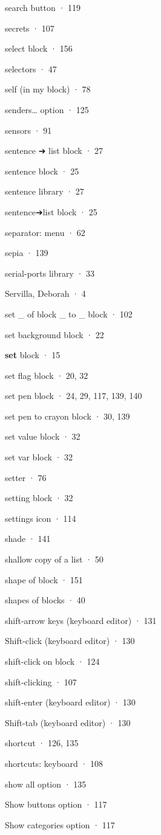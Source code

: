\documentclass[
  letterpaper,
]{book}
\begin{document}
search button · 119

secrets · 107

select block · 156

selectors · 47

self (in my block) · 78

senders\ldots{} option · 125

sensors · 91

sentence ➔ list block · 27

sentence block · 25

sentence library · 27

sentence➔list block · 25

separator: menu · 62

sepia · 139

serial-ports library · 33

Servilla, Deborah · 4

set \_ of block \_ to \_ block · 102

set background block · 22

\textbf{set} block · 15

set flag block · 20, 32

set pen block · 24, 29, 117, 139, 140

set pen to crayon block · 30, 139

set value block · 32

set var block · 32

setter · 76

setting block · 32

settings icon · 114

shade · 141

shallow copy of a list · 50

shape of block · 151

shapes of blocks · 40

shift-arrow keys (keyboard editor) · 131

Shift-click (keyboard editor) · 130

shift-click on block · 124

shift-clicking · 107

shift-enter (keyboard editor) · 130

Shift-tab (keyboard editor) · 130

shortcut · 126, 135

shortcuts: keyboard · 108

show all option · 135

Show buttons option · 117

Show categories option · 117
\end{document}
